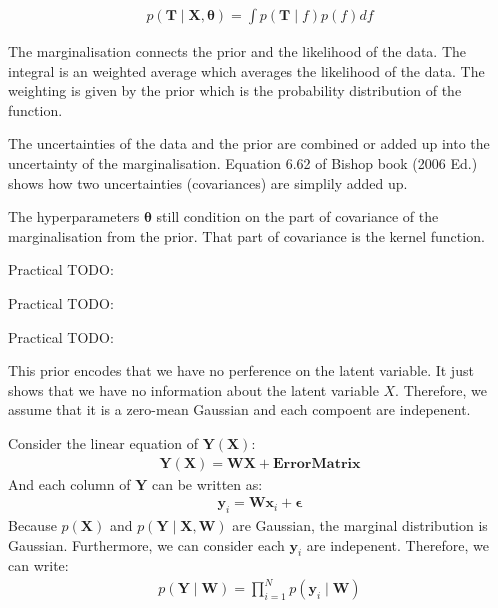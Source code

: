 \documentclass[12pt]{article}
\newenvironment{question}[2][Question]{\begin{trivlist}
\kern10pt
\item[\hskip \labelsep {\bfseries #1}\hskip \labelsep {\bfseries #2.}]}{\end{trivlist}}
\begin{document}
\begin{question}{8}
\begin{align*}
  p(\mathbf{T} \mid \mathbf{X}, \bm{\theta}) = \int p(\mathbf{T}\mid f)p(f) df
\end{align*}

The marginalisation connects the prior and the likelihood of the data. The
 integral is an weighted average which averages the likelihood of the data.
 The weighting is given by the prior which is the probability distribution of
 the function.

The uncertainties of the data and the prior are combined or added up into the 
 uncertainty of the marginalisation. Equation 6.62 of Bishop book (2006 Ed.) shows
 how two uncertainties (covariances) are simplily added up.

The hyperparameters $\bm{\theta}$ still condition on the part of covariance of the 
 marginalisation from the prior. That part of covariance is the kernel function.
\end{question}

\begin{question}{9}
  Practical TODO:
\end{question}

\begin{question}{10}
  Practical TODO:
\end{question}

\begin{question}{11}
  Practical TODO:
\end{question}

\begin{question}{12}
This prior encodes that we have no perference on the latent variable. It just 
 shows that we have no information about the latent variable $X$. Therefore, 
 we assume that it is a zero-mean Gaussian and each compoent are indepenent.
\end{question}

\begin{question}{13}
Consider the linear equation of $\mathbf{Y}(\mathbf{X})$:
  \begin{align*}
    \mathbf{Y}(\mathbf{X}) = \mathbf{W}\mathbf{X} + \bm{ErrorMatrix}
  \end{align*}
And each column of $\mathbf{Y}$ can be written as:
\begin{align*}
  \mathbf{y}_i = \mathbf{W}\mathbf{x}_i + \bm{\epsilon}
\end{align*}
Because $p(\mathbf{X})$ and $p(\mathbf{Y}\mid\mathbf{X}, \mathbf{W})$ are Gaussian, 
 the marginal distribution is Gaussian.
 Furthermore, we can consider each $\mathbf{y}_i$ are indepenent. Therefore, 
 we can write:
\begin{align*}
  p(\mathbf{Y}\mid\mathbf{W}) = \prod_{i=1}^{N} p(\mathbf{y}_i\mid\mathbf{W})
\end{align*}
\end{question}
\end{document}
